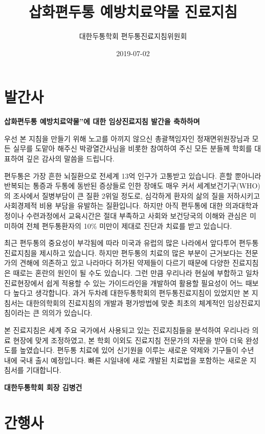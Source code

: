 \documentclass[]{book}
\title{삽화편두통 예방치료약물 진료지침}
\author{대한두통학회 편두통진료지침위원회}
\date{2019-07-02}
\begin{document}
\maketitle

{
\setcounter{tocdepth}{1}
\tableofcontents
}
\frontmatter

\hypertarget{section}{%
\chapter*{발간사}\label{section}}

\textbf{삽화편두통 예방치료약물''에 대한 임상진료지침 발간을 축하하며}

우선 본 지침을 만들기 위해 노고를 아끼지 않으신 총괄책임자인 정재면위원장님과 모든 실무를 도맡아 해주신 박광열간사님을 비롯한 참여하여 주신 모든 분들께 학회를 대표하여 깊은 감사의 말씀을 드립니다.

편두통은 가장 흔한 뇌질환으로 전세계 13억 인구가 고통받고 있습니다. 흔할 뿐아니라 반복되는 통증과 두통에 동반된 증상들로 인한 장애도 매우 커서 세계보건기구(WHO)의 조사에서 질병부담이 큰 질환 2위일 정도로, 심각하게 환자의 삶의 질을 저하시키고 사회경제적 비용 부담을 유발하는 질환입니다. 하지만 아직 편두통에 대한 의과대학과정이나 수련과정에서 교육시간은 절대 부족하고 사회와 보건당국의 이해와 관심은 미미하여 전체 편두통환자의 10\% 미만이 제대로 진단과 치료를 받고 있습니다.

최근 편두통의 중요성이 부각됨에 따라 미국과 유럽의 많은 나라에서 앞다투어 편두통 진료지침을 제시하고 있습니다. 하지만 편두통의 치료의 많은 부분이 근거보다는 전문가의 견해에 의존하고 있고 나라마다 허가된 약제들이 다르기 때문에 다양한 진료지침은 때로는 혼란의 원인이 될 수도 있습니다. 그런 만큼 우리나라 현실에 부합하고 일차 진료현장에서 쉽게 적용할 수 있는 가이드라인을 개발하여 활용할 필요성이 어느 때보다 높다고 생각합니다. 과거 두차례 대한두통학회의 편두통진료지침이 있었지만 본 지침서는 대한의학회의 진료지침의 개발과 평가방법에 맞춘 최초의 체계적인 임상진료지침이라는 큰 의의가 있습니다.

본 진료지침은 세계 주요 국가에서 사용되고 있는 진료지침들을 분석하여 우리나라 의료 현장에 맞게 조정하였고, 본 학회 이외도 진료지침 전문가의 자문을 받아 더욱 완성도를 높였습니다. 편두통 치료에 있어 신기원을 이루는 새로운 약제와 기구들이 수년 내에 국내 출시 예정입니다. 빠른 시일내에 새로 개발된 치료법을 포함하는 새로운 지침서를 기대합니다.

\textbf{대한두통학회 회장 김병건}

\hypertarget{section-1}{%
\chapter*{간행사}\label{section-1}}
\end{document}

